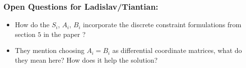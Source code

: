 \documentclass[11pt]{article}
\begin{document}
\subsubsection*{Open Questions for Ladislav/Tiantian:}
\begin{itemize}
	\item How do the $S_i$, $A_i$, $B_i$ incorporate the discrete constraint formulations from
		section $5$ in the paper \cite{projective_dynamics}?
	\item They mention choosing $A_i = B_i$ as differential coordinate matrices, what do they
		mean here? How does it help the solution?
\end{itemize}

{}

\end{document}
